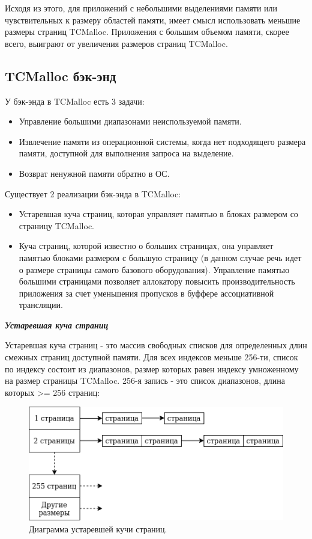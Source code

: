 Исходя из этого, для приложений с небольшими выделениями памяти или чувствительных к размеру областей памяти, имеет смысл использовать меньшие размеры страниц TCMalloc. Приложения с большим объемом памяти, скорее всего, выиграют от увеличения размеров страниц TCMalloc.

\subsection{TCMalloc бэк-энд }
У бэк-энда в TCMalloc есть 3 задачи:
\begin{itemize}
	\item Управление большими диапазонами неиспользуемой памяти.
	\item Извлечение памяти из операционной системы, когда нет подходящего размера памяти, доступной для выполнения запроса на выделение.
	\item Возврат ненужной памяти обратно в ОС.
\end{itemize}

Существует 2 реализации бэк-энда в TCMalloc:
\begin{itemize}
	\item Устаревшая куча страниц, которая управляет памятью в блоках размером со страницу TCMalloc.
	\item Куча страниц, которой известно о больших страницах, она управляет памятью блоками размером с большую страницу (в данном случае речь идет о размере страницы самого базового оборудования). Управление памятью большими страницами позволяет аллокатору повысить производительность приложения за счет уменьшения пропусков в буффере ассоциативной трансляции.
\end{itemize}

\bigbreak
\textit{\textbf{Устаревшая куча страниц}}

Устаревшая куча страниц - это массив свободных списков для определенных длин смежных страниц доступной памяти. Для всех индексов меньше 256-ти, список по индексу состоит из диапазонов, размер которых равен индексу умноженному на размер страницы TCMalloc. 256-я запись - это список диапазонов, длина которых >= 256 страниц:

\begin{figure}[!h]
	\begin{center}
		\includegraphics[scale=0.6]{images/tcmalloc-legacy-pageheap.png}
		\caption{Диаграмма устаревшей кучи страниц.}
		\label{tcmalloc-legacy-pageheap}
	\end{center}
\end{figure}

